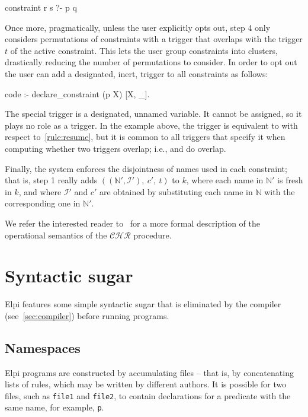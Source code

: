 \documentclass[a4paper, 11pt]{book}
\begin{document}
\begin{elpicode}
constraint r s ?- p q {
}
\end{elpicode}
\noindent
Once more, pragmatically, unless the user explicitly opts out, step 4 only
considers permutations of constraints with a trigger that overlaps with the
trigger $t$ of the active constraint.
This lets the user group constraints into clusters,
drastically reducing the number of permutations
to consider. In order to opt out the user can add a designated, inert,
trigger to all constraints as follows:
\begin{elpicode}
code :- declare_constraint (p X) [X, _].
\end{elpicode}
The special trigger \elpi{_} is a designated, unnamed variable. It cannot be
assigned, so it plays no role as a trigger. In the example above, the trigger
\elpi{[X, _]} is equivalent to \elpi{[X]} with respect to~\ref{rule:resume},
but it is common to all triggers that specify it when computing whether two
triggers overlap; i.e., \elpi{[X, _]} and \elpi{[Y, _]} do overlap.

Finally, the system enforces the disjointness of names used in each constraint;
that is, step 1 really adds $((\mathbb{N'},\mathcal{I'}),\ c',\ t)$ to $k$,
where each name in $\mathbb{N'}$ is fresh in $k$, and where $\mathcal{I'}$ and
$c'$ are obtained by substituting each name in $\mathbb{N}$ with the
corresponding one in $\mathbb{N'}$.

We refer the interested reader to~\cite{TASSI_2019} for a more formal
description of the operational semantics of the $\mathcal{CHR}$ procedure.


\section{Syntactic sugar}


Elpi features some simple syntactic sugar that is eliminated by the compiler (see~\cref{sec:compiler})
before running programs.

\subsection{Namespaces}

Elpi programs are constructed by accumulating files -- that is, by concatenating lists
of rules, which may be written by different authors. It is possible for two
files, such as \texttt{file1} and \texttt{file2}, to contain declarations for a
predicate with the same name, for example, \texttt{p}.
\end{document}
